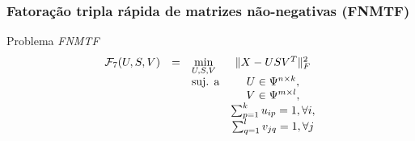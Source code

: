 \documentclass[10pt]{beamer}
\DeclarePairedDelimiter\norm{\lVert}{\rVert}
\begin{document}



\begin{frame}
  \frametitle{Fatoração tripla rápida de matrizes não-negativas (FNMTF)}

  \begin{block}{Problema \textit{FNMTF}}
    \begin{equation}
        \begin{array}{lclcl}
            \displaystyle \mathcal{F}_7(U, S, V) & = & \displaystyle \min_{U, S, V} & \norm{X - USV^T}^{2}_{F} \\
                                                 &   & \text{suj. a}                & U \in \Psi^{n \times k}, \\
                                                 &   &                              & V \in \Psi^{m \times l}, \\
                                                 &   &                              & \sum_{p=1}^{k} u_{ip} = 1, \forall i, \\
                                                 &   &                              & \sum_{q=1}^{l} v_{jq} = 1, \forall j
        \end{array} \nonumber
    \end{equation}
  \end{block}

\end{frame}


\end{document}
